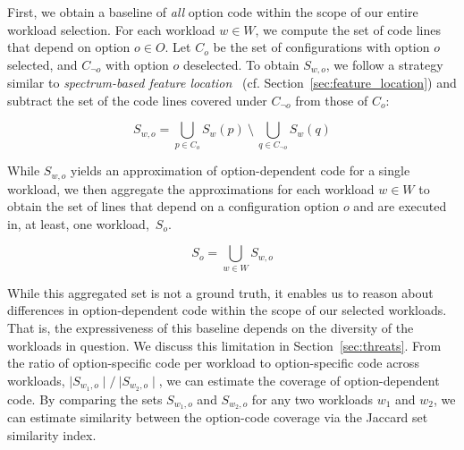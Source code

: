 First, we obtain a baseline of \textit{all} option code within the scope of our entire workload selection. For each workload $w \in W$, we compute the set of code lines that depend on option $o \in O$. Let $C_{o}$ be the set of configurations with option $o$ selected, and $C_{\neg o}$ with option $o$ deselected. To obtain $S_{w, o}$, we follow a strategy similar to \textit{spectrum-based feature location}~\cite{michelon_spectrum_2021} (cf. Section~\ref{sec:feature_location}) and subtract the set of the code lines covered under $C_{\neg o}$ from those of $C_{o}$:

\begin{equation}%
	S_{w, o} = \bigcup_{p \in C_{o}} S_{w}(p) ~ \setminus ~ \bigcup_{q \in C_{\neg o}} S_{w}(q)
\end{equation}

While $S_{w, o}$ yields an approximation of option-dependent code for a single workload, we then aggregate the approximations for each workload $w \in W$ to obtain the set of lines that depend on a configuration option $o$ and are executed in, at least, one workload,~$S_{o}$. 

\begin{equation}
	S_{o} = \bigcup_{w \in W} S_{w, o}
\end{equation}

While this aggregated set is not a ground truth, it enables us to reason about differences in option-dependent code within the scope of our selected workloads. That is, the expressiveness of this baseline depends on the diversity of the workloads in question. We discuss this limitation in Section~\ref{sec:threats}. From the ratio of option-specific code per workload to option-specific code across workloads, $\mid S_{w_1, o}\mid/~{\mid S_{w_2, o}\mid}$, we can estimate the coverage of option-dependent code. By comparing the sets $S_{w_1, o}$ and $S_{w_2, o}$ for any two workloads $w_1$ and $w_2$, we can estimate similarity between the option-code coverage via the Jaccard set similarity index. 




